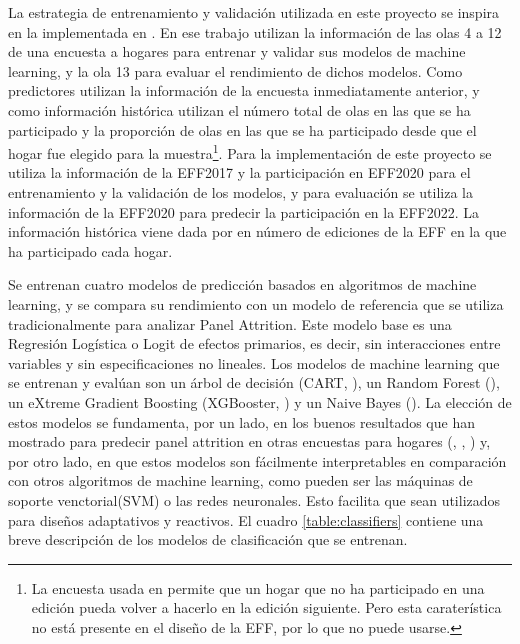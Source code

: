La estrategia de entrenamiento y validación utilizada en este proyecto se inspira en la implementada en \cite{beste2023case}. En ese trabajo utilizan la información de las olas 4 a 12 de una encuesta a hogares para entrenar y validar sus modelos de machine learning, y la ola 13 para evaluar el rendimiento de dichos modelos. Como predictores utilizan la información de la encuesta inmediatamente anterior, y como información histórica utilizan el número total de olas en las que se ha participado y la proporción de olas en las que se ha participado desde que el hogar fue elegido para la muestra\footnote{La encuesta usada en \cite{beste2023case} permite que un hogar que no ha participado en una edición pueda volver a hacerlo en la edición siguiente. Pero esta caraterística no está presente en el diseño de la EFF, por lo que no puede usarse.}. Para la implementación de este proyecto se utiliza la información de la EFF2017 y la participación en EFF2020 para el entrenamiento y la validación de los modelos, y para evaluación se utiliza la información de la EFF2020 para predecir la participación en la EFF2022. La información histórica viene dada por en número de ediciones de la EFF en la que ha participado cada hogar.

Se entrenan cuatro modelos de predicción basados en algoritmos de machine learning, y se compara su rendimiento con un modelo de referencia que se utiliza tradicionalmente para analizar Panel Attrition. Este modelo base es una Regresión Logística o Logit de efectos primarios, es decir, sin interacciones entre variables y sin especificaciones no lineales. Los modelos de machine learning que se entrenan y evalúan son un árbol de decisión (CART, \cite{breiman1984cart}), un Random Forest (\cite{breiman2001random}), un eXtreme Gradient Boosting (XGBooster, \cite{chen2016xgboost}) y un Naive Bayes (\cite{webb2010naive}). La elección de estos modelos se fundamenta, por un lado, en los buenos resultados que han mostrado para predecir panel attrition en otras encuestas para hogares (\cite{kern2019tree}, \cite{kern2021predicting}, \cite{beste2023case}) y, por otro lado, en que estos modelos son fácilmente interpretables en comparación con otros algoritmos de machine learning, como pueden ser las máquinas de soporte venctorial(SVM) o las redes neuronales. Esto facilita que sean utilizados para diseños adaptativos y reactivos. El cuadro \ref{table:classifiers} contiene una breve descripción de los modelos de clasificación que se entrenan.

